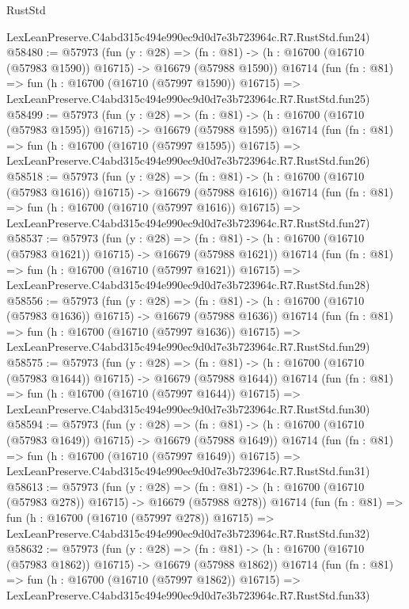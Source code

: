 \begin{lexlean}{RustStd}
\begin{coremodule}
    LexLeanPreserve.C4abd315c494e990ec9d0d7e3b723964c.R7.RustStd.fun24)
@58480 := @57973
    (fun (y : @28) =>
    (fn : @81) -> (h : @16700 (@16710 (@57983 @1590)) @16715) -> @16679 (@57988 @1590))
    @16714
    (fun (fn : @81) =>
    fun (h : @16700 (@16710 (@57997 @1590)) @16715) =>
    LexLeanPreserve.C4abd315c494e990ec9d0d7e3b723964c.R7.RustStd.fun25)
@58499 := @57973
    (fun (y : @28) =>
    (fn : @81) -> (h : @16700 (@16710 (@57983 @1595)) @16715) -> @16679 (@57988 @1595))
    @16714
    (fun (fn : @81) =>
    fun (h : @16700 (@16710 (@57997 @1595)) @16715) =>
    LexLeanPreserve.C4abd315c494e990ec9d0d7e3b723964c.R7.RustStd.fun26)
@58518 := @57973
    (fun (y : @28) =>
    (fn : @81) -> (h : @16700 (@16710 (@57983 @1616)) @16715) -> @16679 (@57988 @1616))
    @16714
    (fun (fn : @81) =>
    fun (h : @16700 (@16710 (@57997 @1616)) @16715) =>
    LexLeanPreserve.C4abd315c494e990ec9d0d7e3b723964c.R7.RustStd.fun27)
@58537 := @57973
    (fun (y : @28) =>
    (fn : @81) -> (h : @16700 (@16710 (@57983 @1621)) @16715) -> @16679 (@57988 @1621))
    @16714
    (fun (fn : @81) =>
    fun (h : @16700 (@16710 (@57997 @1621)) @16715) =>
    LexLeanPreserve.C4abd315c494e990ec9d0d7e3b723964c.R7.RustStd.fun28)
@58556 := @57973
    (fun (y : @28) =>
    (fn : @81) -> (h : @16700 (@16710 (@57983 @1636)) @16715) -> @16679 (@57988 @1636))
    @16714
    (fun (fn : @81) =>
    fun (h : @16700 (@16710 (@57997 @1636)) @16715) =>
    LexLeanPreserve.C4abd315c494e990ec9d0d7e3b723964c.R7.RustStd.fun29)
@58575 := @57973
    (fun (y : @28) =>
    (fn : @81) -> (h : @16700 (@16710 (@57983 @1644)) @16715) -> @16679 (@57988 @1644))
    @16714
    (fun (fn : @81) =>
    fun (h : @16700 (@16710 (@57997 @1644)) @16715) =>
    LexLeanPreserve.C4abd315c494e990ec9d0d7e3b723964c.R7.RustStd.fun30)
@58594 := @57973
    (fun (y : @28) =>
    (fn : @81) -> (h : @16700 (@16710 (@57983 @1649)) @16715) -> @16679 (@57988 @1649))
    @16714
    (fun (fn : @81) =>
    fun (h : @16700 (@16710 (@57997 @1649)) @16715) =>
    LexLeanPreserve.C4abd315c494e990ec9d0d7e3b723964c.R7.RustStd.fun31)
@58613 := @57973
    (fun (y : @28) =>
    (fn : @81) -> (h : @16700 (@16710 (@57983 @278)) @16715) -> @16679 (@57988 @278))
    @16714
    (fun (fn : @81) =>
    fun (h : @16700 (@16710 (@57997 @278)) @16715) =>
    LexLeanPreserve.C4abd315c494e990ec9d0d7e3b723964c.R7.RustStd.fun32)
@58632 := @57973
    (fun (y : @28) =>
    (fn : @81) -> (h : @16700 (@16710 (@57983 @1862)) @16715) -> @16679 (@57988 @1862))
    @16714
    (fun (fn : @81) =>
    fun (h : @16700 (@16710 (@57997 @1862)) @16715) =>
    LexLeanPreserve.C4abd315c494e990ec9d0d7e3b723964c.R7.RustStd.fun33)

\end{coremodule}
\end{lexlean}
